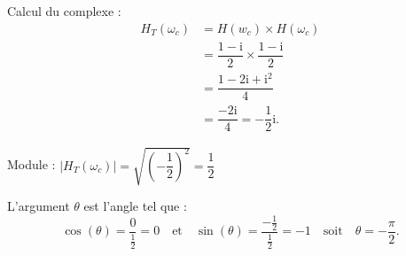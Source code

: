 \medskip

Calcul du complexe :
\begin{align*}
H_T\left(\omega_c\right) &= H\left(w_c\right) \times H\left(\omega_c\right) \\
&= \dfrac{1 - \text{i}}{2} \times \dfrac{1 - \text{i}}{2} \\
&= \dfrac{1 - 2\text{i} + \text{i}^2}{4} \\
&= \dfrac{- 2\text{i}}{4}
= -\dfrac{1}{2}\text{i}.
\end{align*}

Module :
$|H_T\left(\omega_c\right)| = \sqrt{\left(-\dfrac{\text{1}}{2}\right)^2} = \dfrac{1}{2}$

L'argument $\theta$ est l'angle tel que :
\[\cos(\theta) = \dfrac{0}{\frac{1}{2}} = 0 \quad \text{et} \quad \sin(\theta) = \dfrac{-\frac{1}{2}}{\frac{1}{2}} = -1 \quad \text{soit} \quad \theta = -\dfrac{\pi}{2}.\]
